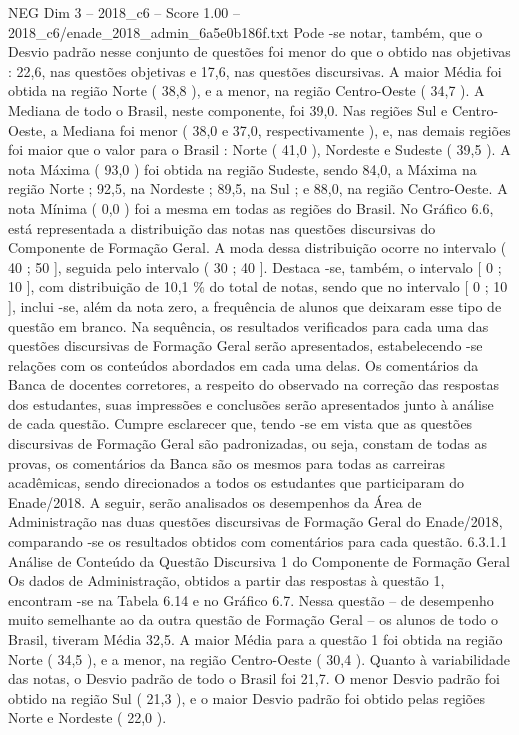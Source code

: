 \begin{textsample}{NEG Dim 3 – 2018\_c6 – Score 1.00 – 2018\_c6/enade\_2018\_admin\_6a5e0b186f.txt}
Pode -se notar, também, que o Desvio padrão nesse conjunto de questões foi menor do que o obtido nas objetivas : 22,6, nas questões objetivas e 17,6, nas questões discursivas.
A maior Média foi obtida na região Norte ( 38,8 ), e a menor, na região Centro-Oeste ( 34,7 ).
A Mediana de todo o Brasil, neste componente, foi 39,0.
Nas regiões Sul e Centro-Oeste, a Mediana foi menor ( 38,0 e 37,0, respectivamente ), e, nas demais regiões foi maior que o valor para o Brasil : Norte ( 41,0 ), Nordeste e Sudeste ( 39,5 ).
A nota Máxima ( 93,0 ) foi obtida na região Sudeste, sendo 84,0, a Máxima na região Norte ; 92,5, na Nordeste ; 89,5, na Sul ; e 88,0, na região Centro-Oeste.
A nota Mínima ( 0,0 ) foi a mesma em todas as regiões do Brasil.
No Gráfico 6.6, está representada a distribuição das notas nas questões discursivas do Componente de Formação Geral.
A moda dessa distribuição ocorre no intervalo ( 40 ; 50 ], seguida pelo intervalo ( 30 ; 40 ].
Destaca -se, também, o intervalo [ 0 ; 10 ], com distribuição de 10,1 \% do total de notas, sendo que no intervalo [ 0 ; 10 ], inclui -se, além da nota zero, a frequência de alunos que deixaram esse tipo de questão em branco.
Na sequência, os resultados verificados para cada uma das questões discursivas de Formação Geral serão apresentados, estabelecendo -se relações com os conteúdos abordados em cada uma delas.
Os comentários da Banca de docentes corretores, a respeito do observado na correção das respostas dos estudantes, suas impressões e conclusões serão apresentados junto à análise de cada questão.
Cumpre esclarecer que, tendo -se em vista que as questões discursivas de Formação Geral são padronizadas, ou seja, constam de todas as provas, os comentários da Banca são os mesmos para todas as carreiras acadêmicas, sendo direcionados a todos os estudantes que participaram do Enade/2018.
A seguir, serão analisados os desempenhos da Área de Administração nas duas questões discursivas de Formação Geral do Enade/2018, comparando -se os resultados obtidos com comentários para cada questão. 6.3.1.1 Análise de Conteúdo da Questão Discursiva 1 do Componente de Formação Geral Os dados de Administração, obtidos a partir das respostas à questão 1, encontram -se na Tabela 6.14 e no Gráfico 6.7.
Nessa questão – de desempenho muito semelhante ao da outra questão de Formação Geral – os alunos de todo o Brasil, tiveram Média 32,5.
A maior Média para a questão 1 foi obtida na região Norte ( 34,5 ), e a menor, na região Centro-Oeste ( 30,4 ).
Quanto à variabilidade das notas, o Desvio padrão de todo o Brasil foi 21,7.
O menor Desvio padrão foi obtido na região Sul ( 21,3 ), e o maior Desvio padrão foi obtido pelas regiões Norte e Nordeste ( 22,0 ).

\end{textsample}
